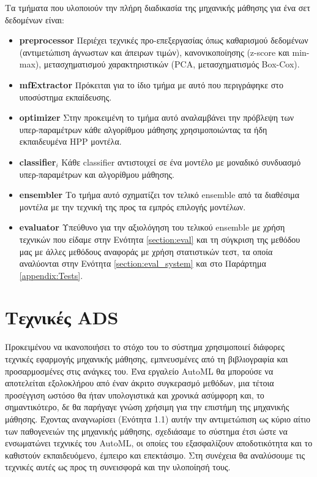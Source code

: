 Τα τμήματα που υλοποιούν την πλήρη διαδικασία της μηχανικής μάθησης για ένα σετ δεδομένων είναι:
\begin{itemize}
	\item \textbf{preprocessor} Περιέχει τεχνικές προ-επεξεργασίας όπως καθαρισμού δεδομένων (αντιμετώπιση άγνωστων και άπειρων τιμών), κανονικοποίησης (z-score και min-max), μετασχηματισμού χαρακτηριστικών (PCA, μετασχηματισμός Box-Cox).
	\item \textbf{mfExtractor} Πρόκειται για το ίδιο τμήμα με αυτό που περιγράφηκε στο υποσύστημα εκπαίδευσης.
	\item \textbf{optimizer} Στην προκειμένη το τμήμα αυτό αναλαμβάνει την πρόβλεψη των υπερ-παρα\-μέτρων κάθε αλγορίθμου μάθησης χρησιμοποιώντας τα ήδη εκπαιδευμένα HPP μοντέλα.    
	\item \textbf{classifier$_i$} Κάθε classifier αντιστοιχεί σε ένα μοντέλο με μοναδικό συνδυασμό υπερ-παραμέ\-τρων και αλγορίθμου μάθησης.
	\item \textbf{ensembler} Το τμήμα αυτό σχηματίζει τον τελικό ensemble από τα διαθέσιμα μοντέλα με την τεχνική της προς τα εμπρός επιλογής μοντέλων.
	\item \textbf{evaluator} Υπεύθυνο για την αξιολόγηση του τελικού ensemble με χρήση τεχνικών που είδαμε στην Ενότητα \ref{section:eval} και τη σύγκριση της μεθόδου μας με άλλες μεθόδους αναφοράς με χρήση στατιστικών τεστ, τα οποία αναλύονται στην Eνότητα \ref{section:eval_system} και στο Παράρτημα \ref{appendix:Tests}.
\end{itemize}

\section{Τεχνικές ADS} \label{sec:techniques}
Προκειμένου να ικανοποιήσει το στόχο του το σύστημα χρησιμοποιεί διάφορες τεχνικές εφαρμογής μηχανικής μάθησης, εμπνευσμένες από τη βιβλιογραφία και προσαρμοσμένες στις ανάγκες του. Ένα εργαλείο \gls{AutoML} θα μπορούσε να αποτελείται εξολοκλήρου από έναν άκριτο συγκερασμό μεθόδων, μια τέτοια προσέγγιση ωστόσο θα ήταν υπολογιστικά και χρονικά ασύμφορη και, το σημαντικότερο, δε θα παρήγαγε γνώση χρήσιμη για την επιστήμη της μηχανικής μάθησης. Έχοντας αναγνωρίσει (Ενότητα 1.1) αυτήν την αντιμετώπιση ως κύριο αίτιο των παθογενειών της μηχανικής μάθησης, σχεδιάσαμε το σύστημα έτσι ώστε να ενσωματώνει τεχνικές του \gls{AutoML}, οι οποίες του εξασφαλίζουν αποδοτικότητα και το καθιστούν εκπαιδευόμενο, έμπειρο και επεκτάσιμο. Στη συνέχεια θα αναλύσουμε τις τεχνικές αυτές ως προς τη συνεισφορά και την υλοποίησή τους.
